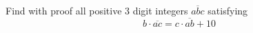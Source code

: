 Find with proof all positive $3$ digit integers $\overline{abc}$ satisfying
\[ b\cdot \overline{ac}=c \cdot \overline{ab} +10 \]